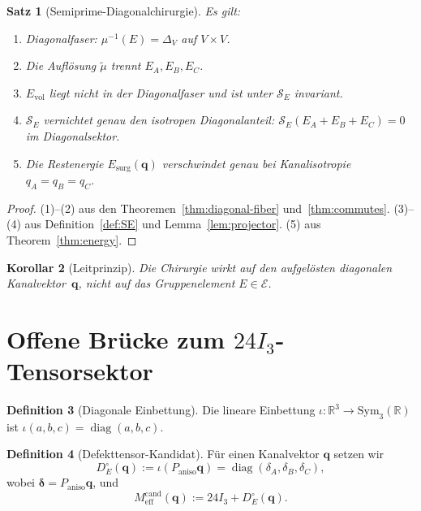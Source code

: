 \documentclass[11pt,a4paper]{article}
\newtheorem{theorem}{Satz}
\newtheorem{corollary}[theorem]{Korollar}
\theoremstyle{definition}
\newtheorem{definition}[theorem]{Definition}
\theoremstyle{remark}
\newcommand{\E}{\mathcal{E}}
\newcommand{\R}{\mathbb{R}}
\newcommand{\qq}{\mathbf{q}}
\newcommand{\Pan}{P_{\mathrm{aniso}}}
\newcommand{\Evol}{E_{\mathrm{vol}}}
\newcommand{\Esurg}{E_{\mathrm{surg}}}
\begin{document}
	\begin{theorem}[Semiprime-Diagonalchirurgie]
		\label{thm:main}
		Es gilt:
		\begin{enumerate}
			\item Diagonalfaser: $\mu^{-1}(E)=\Delta_V$ auf $V\times V$.
			\item Die Auflösung $\widetilde\mu$ trennt $E_A,E_B,E_C$.
			\item $\Evol$ liegt nicht in der Diagonalfaser und ist unter $\mathcal S_E$
			invariant.
			\item $\mathcal S_E$ vernichtet genau den isotropen Diagonalanteil:
			$\mathcal S_E(E_A+E_B+E_C)=0$ im Diagonalsektor.
			\item Die Restenergie $\Esurg(\qq)$ verschwindet genau bei
			Kanalisotropie $q_A=q_B=q_C$.
		\end{enumerate}
	\end{theorem}
	
	\begin{proof}
		(1)--(2) aus den Theoremen~\ref{thm:diagonal-fiber} und~\ref{thm:commutes}.
		(3)--(4) aus Definition~\ref{def:SE} und Lemma~\ref{lem:projector}.
		(5) aus Theorem~\ref{thm:energy}.
	\end{proof}
	
	\begin{corollary}[Leitprinzip]
		\label{cor:principle}
		Die Chirurgie wirkt auf den aufgelösten diagonalen Kanalvektor~$\qq$,
		nicht auf das Gruppenelement $E\in\E$.
	\end{corollary}
	
	\section{Offene Brücke zum $24I_3$-Tensorsektor}
	\label{sec:bridge}
	
	\begin{definition}[Diagonale Einbettung]
		\label{def:embed}
		Die lineare Einbettung $\iota:\R^3\to\mathrm{Sym}_3(\R)$ ist
		$\iota(a,b,c)=\operatorname{diag}(a,b,c)$.
	\end{definition}
	
	\begin{definition}[Defekttensor-Kandidat]
		\label{def:DE}
		Für einen Kanalvektor $\qq$ setzen wir
		\[
		D_E^\circ(\qq)
		:=
		\iota(\Pan\qq)
		=
		\operatorname{diag}(\delta_A,\delta_B,\delta_C),
		\]
		wobei $\boldsymbol\delta=\Pan\qq$, und
		\[
		M_{\mathrm{eff}}^{\mathrm{cand}}(\qq)
		:=
		24I_3+D_E^\circ(\qq).
		\]
	\end{definition}
	
\end{document}

